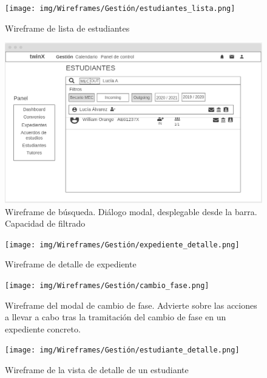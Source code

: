 \begin{figure}
	\centering
	\texttt{[image: img/Wireframes/Gestión/estudiantes\_lista.png]}
	\caption{Wireframe de lista de estudiantes}
	\label{fig:estudiantes_listaWF}
\end{figure}

\begin{figure}
	\centering
	\includegraphics[width=\textwidth]{img/Wireframes/Gestión/búsqueda.png}
	\caption[Wireframe de búsqueda]{Wireframe de búsqueda. Diálogo modal, desplegable desde la barra. Capacidad de filtrado}
	\label{fig:búsquedaWF}
\end{figure}

\begin{figure}
	\centering
	\texttt{[image: img/Wireframes/Gestión/expediente\_detalle.png]}
	\caption{Wireframe de detalle de expediente}
	\label{fig:expediente_detalleWF}
\end{figure}

\begin{figure}
	\centering
	\texttt{[image: img/Wireframes/Gestión/cambio\_fase.png]}
	\caption[Wireframe del modal de cambio de fase]{Wireframe del modal de cambio de fase. Advierte sobre las acciones a llevar a cabo tras la tramitación del cambio de fase en un expediente concreto.}
	\label{fig:cambio_faseWF}
\end{figure}

\begin{figure}
	\centering
	\texttt{[image: img/Wireframes/Gestión/estudiante\_detalle.png]}
	\caption{Wireframe de la vista de detalle de un estudiante}
	\label{fig:estudiante_detalleWF}
\end{figure}

\newpage

